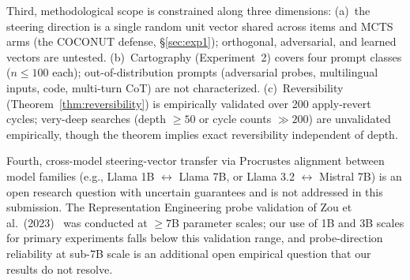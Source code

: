 Third, methodological scope is constrained along three dimensions: (a)~the steering direction is a single random unit vector shared across items and MCTS arms (the COCONUT defense, §\ref{sec:exp1}); orthogonal, adversarial, and learned vectors are untested. (b)~Cartography (Experiment~2) covers four prompt classes ($n \le 100$ each); out-of-distribution prompts (adversarial probes, multilingual inputs, code, multi-turn CoT) are not characterized. (c)~Reversibility (Theorem~\ref{thm:reversibility}) is empirically validated over 200 apply-revert cycles; very-deep searches (depth $\ge 50$ or cycle counts $\gg 200$) are unvalidated empirically, though the theorem implies exact reversibility independent of depth.

Fourth, cross-model steering-vector transfer via Procrustes alignment between model families (e.g., Llama 1B $\leftrightarrow$ Llama 7B, or Llama 3.2 $\leftrightarrow$ Mistral 7B) is an open research question with uncertain guarantees and is not addressed in this submission. The Representation Engineering probe validation of Zou et al.\ (2023)~\cite{zou2023repe} was conducted at $\ge 7$B parameter scales; our use of 1B and 3B scales for primary experiments falls below this validation range, and probe-direction reliability at sub-7B scale is an additional open empirical question that our results do not resolve.
\label{sec:limitations}

